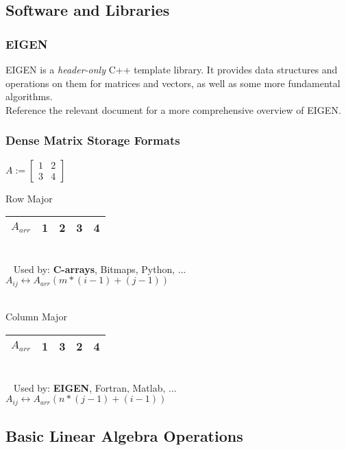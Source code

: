 \documentclass[12pt]{article}
\begin{document}
\subsection{Software and Libraries}
\subsubsection{EIGEN}
EIGEN is a \textit{header-only} C++ template library. It provides data structures and operations on them for matrices and vectors, as well as some more fundamental algorithms.\\%
Reference the relevant document for a more comprehensive overview of EIGEN.
\subsubsection{Dense Matrix Storage Formats}
$A := \begin{bmatrix}1 & 2 \\ 3 & 4 \end{bmatrix}$\\
\begin{large}Row Major\end{large} 
\begin{tabular}{|c|c|c|c|c|}
\hline $A_{arr}$ & 1 & 2 & 3 & 4\\
\hline
\end{tabular}\\
\-\ \hspace*{0.2cm} Used by: \textbf{C-arrays}, Bitmaps, Python, ...\\
$A_{ij} \leftrightarrow A_{arr} (m*(i-1)+(j-1))$\\\\
\begin{large}Column Major\end{large} 
\begin{tabular}{|c|c|c|c|c|}
\hline $A_{arr}$ & 1 & 3 & 2 & 4\\
\hline
\end{tabular}\\
\-\ \hspace*{0.2cm} Used by: \textbf{EIGEN}, Fortran, Matlab, ...\\
$A_{ij} \leftrightarrow A_{arr} (n*(j-1) + (i-1))$
\subsection{Basic Linear Algebra Operations}
\end{document}
